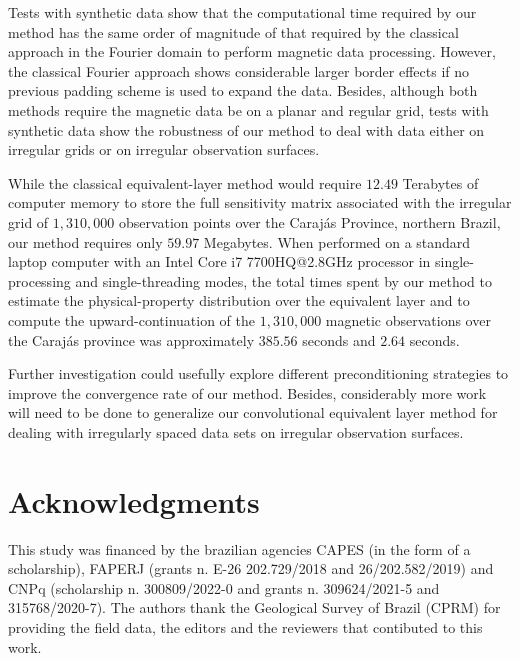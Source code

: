 \documentclass[manuscript,noblind]{geophysics}
\begin{document}
Tests with synthetic data show that the computational time required by our method has 
the same order of magnitude of that required by the classical approach in the Fourier domain
to perform magnetic data processing.
However, the classical Fourier approach shows considerable larger border effects if no previous 
padding scheme is used to expand the data. 
Besides, although both methods require the magnetic data be on a planar and regular grid, 
tests with synthetic data show the robustness of our method to deal with data either on irregular grids
or on irregular observation surfaces.

While the classical equivalent-layer method would require $12.49$ Terabytes of computer memory to store the full
sensitivity matrix associated with the irregular grid of $1,310,000$ observation points over the
Carajás Province, northern Brazil, our method requires only $59.97$ Megabytes.
When performed on a standard laptop computer with an Intel Core i7 7700HQ@2.8GHz processor in
single-processing and single-threading modes, the total times spent by our method to estimate the
physical-property distribution over the equivalent layer and to compute the upward-continuation
of the $1,310,000$ magnetic observations over the Carajás province was approximately $385.56$ 
seconds and $2.64$ seconds.

Further investigation could usefully explore different preconditioning strategies to improve the
convergence rate of our method. Besides, considerably more work will need to be done to generalize
our convolutional equivalent layer method for dealing with irregularly spaced data sets on 
irregular observation surfaces.

\section{Acknowledgments}
This study was financed by the brazilian agencies CAPES (in the form of a scholarship), FAPERJ
(grants n. E-26 202.729/2018 and 26/202.582/2019) and CNPq (scholarship n. 300809/2022-0 and grants n. 309624/2021-5 and 315768/2020-7). The authors thank the Geological Survey of Brazil (CPRM) for providing the field data, the editors and the reviewers that contibuted to this work.

\end{document}
